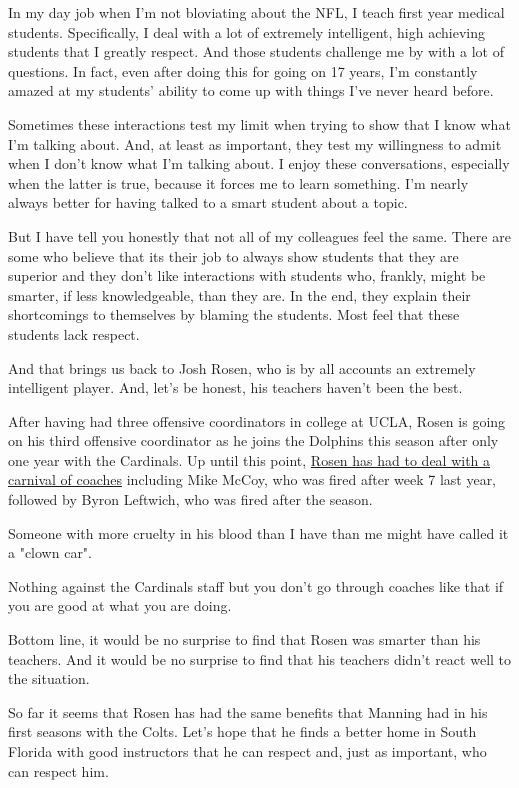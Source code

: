 \documentclass[11pt]{article}
\begin{document}
In my day job when I'm not bloviating about the NFL, I teach first year medical students.  Specifically, I deal with a lot of extremely intelligent, high achieving students that I greatly respect.  And those students challenge me by with a lot of questions.  In fact, even after doing this for going on 17 years, I'm constantly amazed at my students' ability to come up with things I've never heard before.

Sometimes these interactions test my limit when trying to show that I know what I'm talking about.  And, at least as important, they test my willingness to admit when I don't know what I'm talking about.  I enjoy these conversations, especially when the latter is true, because it forces me to learn something.  I'm nearly always better for having talked to a smart student about a topic.

But I have tell you honestly that not all of my colleagues feel the same.  There are some who believe that its their job to always show students that they are superior and they don't like interactions with students who, frankly, might be smarter, if less knowledgeable, than they are.  In the end, they explain their shortcomings to themselves by blaming the students.  Most feel that these students lack respect.

And that brings us back to Josh Rosen, who is by all accounts an extremely intelligent player.  And, let's be honest, his teachers haven't been the best.

After having had three offensive coordinators in college at UCLA, Rosen is going on his third offensive coordinator as he joins the Dolphins this season after only one year with the Cardinals.  Up until this point, \href{http://www.espn.com/blog/nflnation/post/_/id/288438/the-good-and-bad-of-josh-rosens-five-offensive-coordinators-in-four-years}{Rosen has had to deal with a carnival of coaches} including Mike McCoy, who was fired after week 7 last year, followed by Byron Leftwich, who was fired after the season.  

Someone with more cruelty in his blood than I have than me might have called it a "clown car".  

Nothing against the Cardinals staff but you don't go through coaches like that if you are good at what you are doing.

Bottom line, it would be no surprise to find that Rosen was smarter than his teachers.  And it would be no surprise to find that his teachers didn't react well to the situation.

So far it seems that Rosen has had the same benefits that Manning had in his first seasons with the Colts.  Let's hope that he finds a better home in South Florida with good instructors that he can respect and, just as important, who can respect him.
\end{document}
